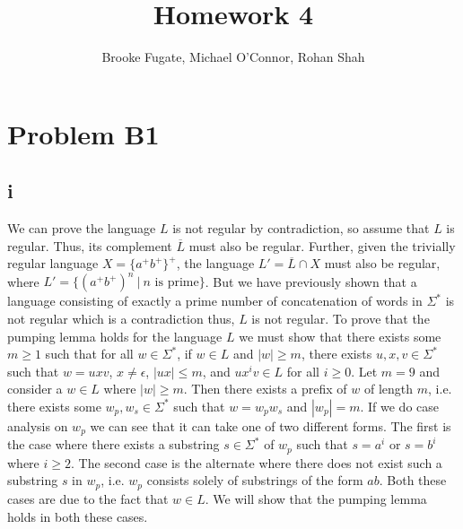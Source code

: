 \documentclass[12pt]{article}
\begin{document}
\pagestyle{plain}
\titleformat{\subsection}[runin]
  {\normalfont\large\bfseries}{\thesubsection}{1em}{}

\title{Homework 4}
\author{Brooke Fugate, Michael O'Connor, Rohan Shah}
\date{}

\maketitle

\section*{Problem B1}
\subsection*{i}
We can prove the language $L$ is not regular by contradiction, so assume that
$L$ is regular. Thus, its complement $\overline{L}$ must also be regular.
Further, given the trivially regular language $X = \{a^+b^+\}^+$, the language
$L' = \overline{L} \cap X$ must also be regular, where
$L' = \{(a^+b^+)^n\ |\ n \text{ is prime}\}$. But we have previously
shown that a language consisting of exactly a prime number of concatenation
of words in $\Sigma^*$ is not regular which is a contradiction thus, $L$ is not
regular.
\medskip
\newline
To prove that the pumping lemma holds for the language $L$ we must show that
there exists some $m \ge 1$ such that for all $w \in \Sigma^*$, if $w \in L$
and $|w| \ge m$, there exists $u,x,v \in \Sigma^*$ such that $w = uxv$,
$x \neq \epsilon$, $|ux| \le m$, and $ux^iv \in L$ for all $i \ge 0$. Let
$m = 9$ and consider a $w \in L$ where $|w| \ge m$. Then there exists a
prefix of $w$ of length $m$, i.e. there exists some $w_p,w_s \in \Sigma^*$
such that $w = w_pw_s$ and $|w_p| = m$. If we do case analysis on
$w_p$ we can see that it can take one of two different forms. The first is the
case where there exists a substring $s \in \Sigma^*$ of $w_p$ such that
$s = a^i$ or $s = b^i$ where $i \ge 2$. The second case is the alternate where
there does not exist such a substring $s$ in $w_p$, i.e. $w_p$ consists solely
of substrings of the form $ab$. Both these cases are due to the fact that
$w \in L$. We will show that the pumping lemma holds in both these cases.
\medskip
\newline
\end{document}
